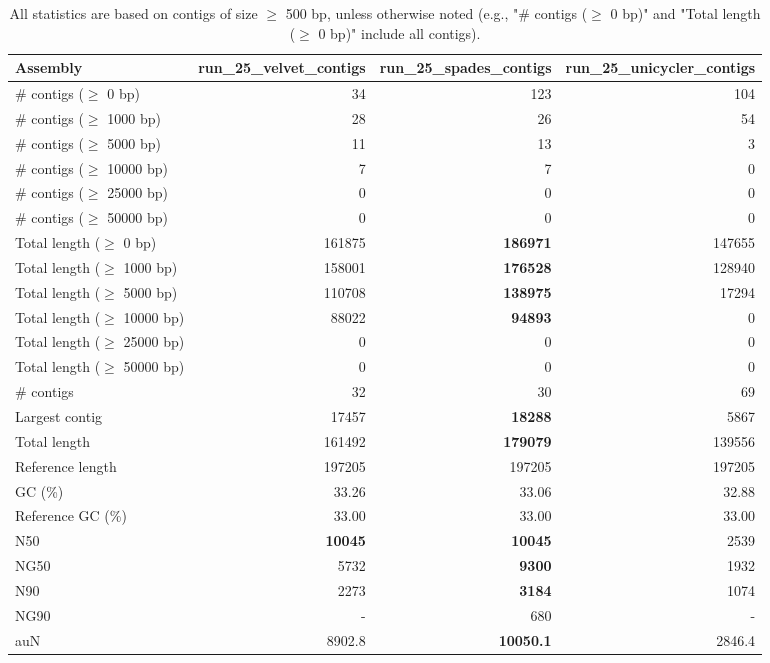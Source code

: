 \documentclass[12pt,a4paper]{article}
\begin{document}
\begin{table}[ht]
\begin{center}
\caption{All statistics are based on contigs of size $\geq$ 500 bp, unless otherwise noted (e.g., "\# contigs ($\geq$ 0 bp)" and "Total length ($\geq$ 0 bp)" include all contigs).}
\begin{tabular}{|l*{3}{|r}|}
\hline
Assembly & run\_25\_velvet\_contigs & run\_25\_spades\_contigs & run\_25\_unicycler\_contigs \\ \hline
\# contigs ($\geq$ 0 bp) & 34 & 123 & 104 \\ \hline
\# contigs ($\geq$ 1000 bp) & 28 & 26 & 54 \\ \hline
\# contigs ($\geq$ 5000 bp) & 11 & 13 & 3 \\ \hline
\# contigs ($\geq$ 10000 bp) & 7 & 7 & 0 \\ \hline
\# contigs ($\geq$ 25000 bp) & 0 & 0 & 0 \\ \hline
\# contigs ($\geq$ 50000 bp) & 0 & 0 & 0 \\ \hline
Total length ($\geq$ 0 bp) & 161875 & {\bf 186971} & 147655 \\ \hline
Total length ($\geq$ 1000 bp) & 158001 & {\bf 176528} & 128940 \\ \hline
Total length ($\geq$ 5000 bp) & 110708 & {\bf 138975} & 17294 \\ \hline
Total length ($\geq$ 10000 bp) & 88022 & {\bf 94893} & 0 \\ \hline
Total length ($\geq$ 25000 bp) & 0 & 0 & 0 \\ \hline
Total length ($\geq$ 50000 bp) & 0 & 0 & 0 \\ \hline
\# contigs & 32 & 30 & 69 \\ \hline
Largest contig & 17457 & {\bf 18288} & 5867 \\ \hline
Total length & 161492 & {\bf 179079} & 139556 \\ \hline
Reference length & 197205 & 197205 & 197205 \\ \hline
GC (\%) & 33.26 & 33.06 & 32.88 \\ \hline
Reference GC (\%) & 33.00 & 33.00 & 33.00 \\ \hline
N50 & {\bf 10045} & {\bf 10045} & 2539 \\ \hline
NG50 & 5732 & {\bf 9300} & 1932 \\ \hline
N90 & 2273 & {\bf 3184} & 1074 \\ \hline
NG90 & - & 680 & - \\ \hline
auN & 8902.8 & {\bf 10050.1} & 2846.4 \\ \hline

\end{tabular}
\end{center}
\end{table}
\end{document}
